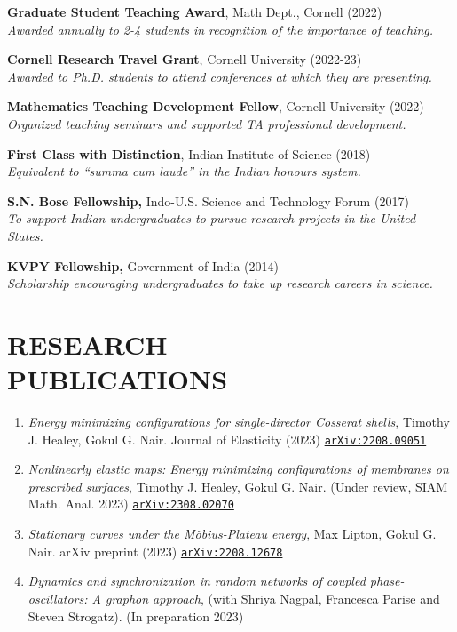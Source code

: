 \documentclass[margin]{res} %
\begin{document}
\begin{resume}
{\bf Graduate Student Teaching Award}, Math Dept., Cornell (2022)\\
\textit{Awarded annually to 2-4 students in recognition of the importance of teaching. }

{\bf Cornell Research Travel Grant}, Cornell University (2022-23)\\
\textit{Awarded to Ph.D. students to attend conferences at which they are presenting.}

{\bf Mathematics Teaching Development Fellow}, Cornell University (2022)\\
\textit{Organized teaching seminars and supported TA professional development.}

{\bf First Class with Distinction}, Indian Institute of Science (2018)\\
\textit{Equivalent to ``summa cum laude'' in the Indian honours system.}

{\bf S.N. Bose Fellowship,} Indo-U.S. Science and Technology Forum (2017)\\
\textit{To support Indian undergraduates to pursue research projects in the United States.}

{\bf KVPY Fellowship,} Government of India (2014)\\
\textit{Scholarship encouraging undergraduates to take up research careers in science.}

\section{RESEARCH\\PUBLICATIONS}
\begin{enumerate}
	\item {\sl Energy minimizing configurations for single-director Cosserat shells}, Timothy J. Healey, Gokul G. Nair. Journal of Elasticity (2023) \href{https://arxiv.org/abs/2208.09051}{\texttt{arXiv:2208.09051}}

	\item {\sl Nonlinearly elastic maps: Energy minimizing configurations of membranes on prescribed surfaces}, Timothy J. Healey, Gokul G. Nair. (Under review, SIAM Math. Anal. 2023) \href{https://arxiv.org/abs/2308.02070}{\texttt{arXiv:2308.02070}} 
	
	\item {\sl Stationary curves under the M\"obius-Plateau energy}, Max Lipton, Gokul G. Nair. arXiv preprint (2023) \href{https://arxiv.org/abs/2208.12678}{\texttt{arXiv:2208.12678}} 
	
	\item {\sl Dynamics and synchronization in random networks of coupled phase-oscillators: A graphon approach}, (with Shriya Nagpal, Francesca Parise and Steven Strogatz). (In preparation 2023)
	

\end{enumerate}
\end{resume}
\end{document}
